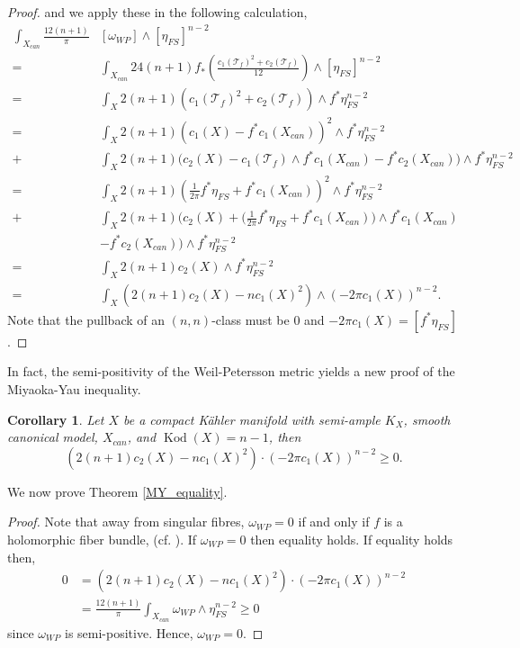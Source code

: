 \documentclass[12pt]{article}
\newtheorem{corollary}[theorem]{Corollary}
\numberwithin{equation}{section}
\newcommand{\T}{\mathcal{T}}
\DeclareMathOperator{\Kod}{Kod}
\begin{document}
\begin{proof}
and we apply these in the following calculation,
\allowdisplaybreaks
\begin{align*}
    \int_{X_{can}} \frac{12(n+1)}{\pi} &[\omega_{WP}] \wedge [\eta_{FS}]^{n-2}\\
    =& \int_{X_{can}} 24(n+1) f_* \left(\frac{c_1(\T_f)^2 + c_2(\T_f)}{12}\right) \wedge [\eta_{FS}]^{n-2}\\
    =& \int_X 2(n+1) (c_1(\T_f)^2 + c_2(\T_f)) \wedge f^*\eta_{FS}^{n-2}\\
    =& \int_X 2(n+1)\left(c_1(X) - f^*c_1(X_{can})\right)^2 \wedge f^*\eta_{FS}^{n-2}\\
    +&\int_X 2(n+1) \Big( c_2(X) - c_1(\T_f) \wedge f^* c_1(X_{can}) - f^* c_2(X_{can})\Big) \wedge f^*\eta_{FS}^{n-2}\\ 
    =& \int_X 2(n+1)\left(\frac{1}{2\pi}f^*\eta_{FS} + f^*c_1(X_{can})\right)^2 \wedge f^*\eta_{FS}^{n-2}\\
    +&\int_X 2(n+1) \Big( c_2(X) + \Big(\frac{1}{2\pi} f^*\eta_{FS} + f^*c_1(X_{can})\Big) \wedge f^* c_1(X_{can})\\
    &- f^* c_2(X_{can})\Big) \wedge f^*\eta_{FS}^{n-2}\\ 
    =& \int_X 2(n+1) c_2(X) \wedge f^*\eta_{FS}^{n-2}\\
    =& \int_X (2(n+1) c_2(X) - n c_1(X)^2) \wedge (-2 \pi c_1(X))^{n-2}.
\end{align*}
Note that the pullback of an $(n,n)$-class must be $0$ and $-2\pi c_1(X) = [f^*\eta_{FS}]$.
\end{proof}

\noindent In fact, the semi-positivity of the Weil-Petersson metric yields a new proof of the Miyaoka-Yau inequality.

\begin{corollary}
Let $X$ be a compact K\"ahler manifold with semi-ample $K_X$, smooth canonical model, $X_{can}$, and $\Kod(X) = n-1$, then
\begin{equation*}
    (2(n+1) c_2(X) - n c_1(X)^2) \cdot (-2 \pi c_1(X))^{n-2} \geq 0.
\end{equation*}
\end{corollary}

\noindent We now prove Theorem \ref{MY_equality}.

\begin{proof}
Note that away from singular fibres, $\omega_{WP} = 0$ if and only if $f$ is a holomorphic fiber bundle, (cf. \cite[Prop. 5.7.]{T19}). If $\omega_{WP} = 0$ then equality holds. If equality holds then,
\begin{align*}
    0 &= (2(n+1) c_2(X) - n c_1(X)^2) \cdot (-2\pi c_1(X))^{n-2}\\
    &= \frac{12(n+1)}{\pi}\int_{X_{can}} \omega_{WP} \wedge \eta_{FS}^{n-2} \geq 0
\end{align*}
since $\omega_{WP}$ is semi-positive. Hence, $\omega_{WP} = 0$.
\end{proof}
\end{document}
